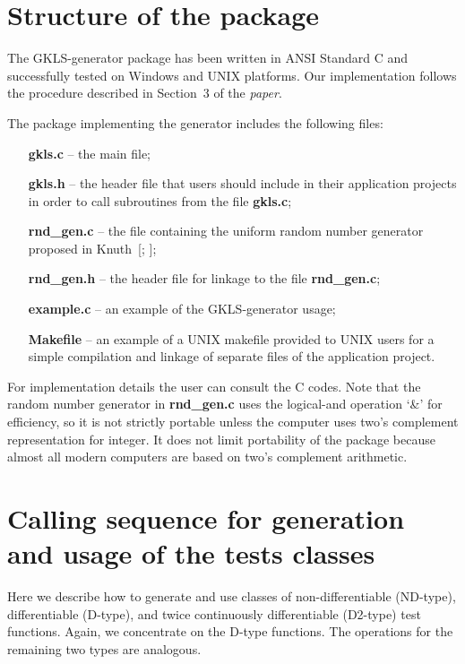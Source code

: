 \documentclass[acmtoms]{acmtrans2m}
\begin{document}
\section{Structure of the package} \label{sectionStructure}

The GKLS-generator package has been written in ANSI Standard C and
successfully tested on Windows and UNIX platforms. Our
implementation follows the procedure described in Section~3 of the
{\it paper}.

The package implementing the generator includes the following
files:
 \begin{itemize}
  \item[\bf gkls.c] -- the main file;
  \item[\bf gkls.h] -- the header file that users should include in
  their application projects in order to call subroutines from
  the file {\bf gkls.c};
  \item[\bf rnd\_gen.c] -- the file containing the uniform random number
  generator proposed in Knuth~[;
  ];
  \item[\bf rnd\_gen.h] -- the header file for linkage to the file {\bf
  rnd\_gen.c};
  \item[\bf example.c] -- an example of the GKLS-generator usage;
  \item[\bf Makefile] -- an example of a UNIX makefile provided to
  UNIX users for a simple compilation and linkage of separate files
  of the application project.
 \end{itemize}

For implementation details the user can consult the C codes. Note
that the random number generator in {\bf rnd\_gen.c} uses the
logical-and operation `\&' for efficiency, so it is not strictly
portable unless the computer uses two's complement representation
for integer. It does not limit portability of the package because
almost all modern computers are based on two's complement
arithmetic.

\section{Calling sequence for generation and usage of the tests
classes} \label{sectionInstructions}

Here we describe how to generate and use classes of
non-differentiable (ND-type), differentiable (D-type), and twice
continuously differentiable (D2-type) test functions. Again, we
concentrate on the D-type functions. The operations for the
remaining two types are analogous.
\end{document}

